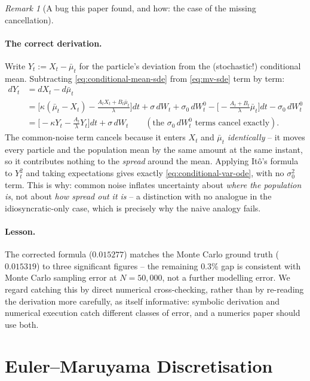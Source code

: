\documentclass[11pt]{article}
\theoremstyle{remark}
\newtheorem{remark}[theorem]{Remark}
\begin{document}
\begin{remark}[A bug this paper found, and how: the case of the missing cancellation]
\paragraph{The correct derivation.} Write $Y_t := X_t - \bar\mu_t$ for the
particle's deviation from the (stochastic!) conditional mean. Subtracting
\eqref{eq:conditional-mean-sde} from \eqref{eq:mv-sde} term by term:
\begin{align*}
    dY_t &= dX_t - d\bar\mu_t \\
    &= \Big[\kappa(\bar\mu_t-X_t) - \frac{A_tX_t+B_t\bar\mu_t}{\lambda}\Big]dt +
    \sigma\,dW_t + \sigma_0\,dW_t^0 - \Big[-\frac{A_t+B_t}{\lambda}\bar\mu_t\Big]dt
    - \sigma_0\,dW_t^0 \\
    &= \Big[-\kappa Y_t - \frac{A_t}{\lambda}Y_t\Big]dt + \sigma\,dW_t
    \qquad (\text{the } \sigma_0\,dW_t^0 \text{ terms cancel exactly}).
\end{align*}
The common-noise term cancels because it enters $X_t$ and $\bar\mu_t$
\emph{identically} -- it moves every particle and the population mean by the same
amount at the same instant, so it contributes nothing to the \emph{spread} around
the mean. Applying It\^o's formula to $Y_t^2$ and taking expectations gives
exactly \eqref{eq:conditional-var-ode}, with no $\sigma_0^2$ term. This is why:
common noise inflates uncertainty about \emph{where the population is}, not about
\emph{how spread out it is} -- a distinction with no analogue in the
idiosyncratic-only case, which is precisely why the naive analogy fails.

\paragraph{Lesson.} The corrected formula ($0.015277$) matches the Monte Carlo
ground truth ($0.015319$) to three significant figures -- the remaining $0.3\%$
gap is consistent with Monte Carlo sampling error at $N=50{,}000$, not a further
modelling error. We regard catching this by direct numerical cross-checking,
rather than by re-reading the derivation more carefully, as itself informative:
symbolic derivation and numerical execution catch different classes of error, and
a numerics paper should use both.
\end{remark}

\section{Euler--Maruyama Discretisation}
\label{sec:em-scheme}
\end{document}
